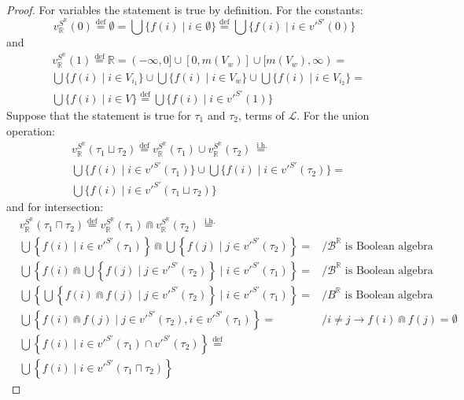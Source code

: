 \documentclass{article}
\newcommand{\R}{\mathbb{R}}
\newcommand{\B}{\mathcal{B}}
\newcommand{\bcap}{\Cap}
\newcommand{\lang}{\mathcal{L}}
\newcommand{\lcup}{\sqcup}
\newcommand{\lcap}{\sqcap}
\newcommand{\eqdef}{\stackrel{\text{def}}{=}}
\newcommand{\eqih}{\stackrel{\text{ i.h.}}{=}}
\begin{document}
\begin{proof}
    For variables the statement is true by definition. For the constants:
    \begin{equation*}
      v_\R^{S^\R}(0) \eqdef \emptyset = \bigcup\{ f(i) \mid i \in \emptyset\} \eqdef \bigcup\{ f(i) \mid i \in v'^{S'}(0)\}
    \end{equation*}
    and
    \begin{align*}
      & v_\R^{S^\R}(1) \eqdef \R = (-\infty, 0] \cup [0, m(V_w)] \cup [m(V_w), \infty) = \\
    & \bigcup\{ f(i) \mid i \in V_{i_1}\} \cup \bigcup\{ f(i) \mid i \in V_w\} \cup \bigcup\{ f(i) \mid i \in V_{i_2}\} = \\
    & \bigcup\{ f(i) \mid i \in V\} \eqdef \bigcup\{ f(i) \mid i \in v'^{S'}(1)\}
    \end{align*}
Suppose that the statement is true for $\tau_1$ and $\tau_2$, terms of $\lang$. For the union operation:
    \begin{align*}
      & v_\R^{S^\R}(\tau_1 \lcup \tau_2) \eqdef v_\R^{S^\R}(\tau_1) \cup v_\R^{S^\R}(\tau_2) \eqih \\
      & \bigcup\{ f(i) \mid i \in v'^{S'}(\tau_1)\} \cup \bigcup\{ f(i) \mid i \in v'^{S'}(\tau_2)\} = \\
      & \bigcup\{ f(i) \mid i \in v'^{S'}(\tau_1 \lcup \tau_2)\}
    \end{align*}
    and for intersection:
    \begin{align*}
      & v_\R^{S^\R}(\tau_1 \lcap \tau_2) \eqdef v_\R^{S^\R}(\tau_1) \bcap v_\R^{S^\R}(\tau_2) \eqih \\
      & \bigcup\left\{ f(i) \mid i \in v'^{S'}(\tau_1)\right\} \bcap \bigcup\left\{ f(j) \mid j \in v'^{S'}(\tau_2)\right\} = & /\B^\R \text{ is Boolean algebra} \\
      & \bigcup\left\{ f(i) \bcap \bigcup\left\{ f(j) \mid j \in v'^{S'}(\tau_2)\right\} \mid i \in v'^{S'}(\tau_1)\right\} = & /\B^\R \text{ is Boolean algebra} \\
      & \bigcup\left\{ \bigcup\left\{ f(i) \bcap f(j) \mid j \in v'^{S'}(\tau_2)\right\} \mid i \in v'^{S'}(\tau_1)\right\} = & /B^\R \text{ is Boolean algebra} \\
      & \bigcup\left\{ f(i) \bcap f(j) \mid j \in v'^{S'}(\tau_2), i \in v'^{S'}(\tau_1)\right\} = & / i \neq j \rightarrow f(i) \bcap f(j) = \emptyset \\
      & \bigcup\left\{ f(i) \mid i \in v'^{S'}(\tau_1) \cap v'^{S'}(\tau_2)\right\} \eqdef \\
      & \bigcup\left\{ f(i) \mid i \in v'^{S'}(\tau_1 \lcap \tau_2)\right\}

\end{align*}
\end{proof}
\end{document}
